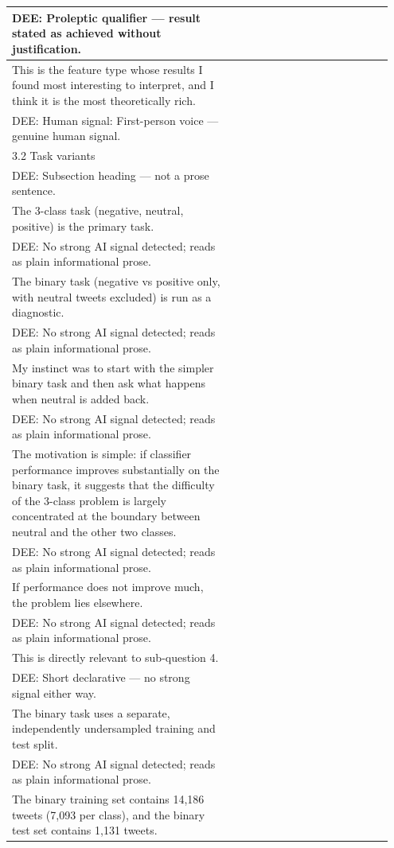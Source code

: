 \documentclass[11pt]{article}
\begin{document}
\begin{longtable}{|p{0.55\linewidth}|p{0.40\linewidth}|}
\hline
DEE: Proleptic qualifier --- result stated as achieved without justification. & \\
\hline
This is the feature type whose results I found most interesting to interpret, and I think it is the most theoretically rich. & \\[2pt]
\hline
DEE: Human signal: First-person voice --- genuine human signal. & \\
\hline
3.2 Task variants & \\[2pt]
\hline
DEE: Subsection heading --- not a prose sentence. & \\
\hline
The 3-class task (negative, neutral, positive) is the primary task. & \\[2pt]
\hline
DEE: No strong AI signal detected; reads as plain informational prose. & \\
\hline
The binary task (negative vs positive only, with neutral tweets excluded) is run as a diagnostic. & \\[2pt]
\hline
DEE: No strong AI signal detected; reads as plain informational prose. & \\
\hline
My instinct was to start with the simpler binary task and then ask what happens when neutral is added back. & \\[2pt]
\hline
DEE: No strong AI signal detected; reads as plain informational prose. & \\
\hline
The motivation is simple: if classifier performance improves substantially on the binary task, it suggests that the difficulty of the 3-class problem is largely concentrated at the boundary between neutral and the other two classes. & \\[2pt]
\hline
DEE: No strong AI signal detected; reads as plain informational prose. & \\
\hline
If performance does not improve much, the problem lies elsewhere. & \\[2pt]
\hline
DEE: No strong AI signal detected; reads as plain informational prose. & \\
\hline
This is directly relevant to sub-question 4. & \\[2pt]
\hline
DEE: Short declarative --- no strong signal either way. & \\
\hline
The binary task uses a separate, independently undersampled training and test split. & \\[2pt]
\hline
DEE: No strong AI signal detected; reads as plain informational prose. & \\
\hline
The binary training set contains 14,186 tweets (7,093 per class), and the binary test set contains 1,131 tweets. & \\[2pt]

\end{longtable}
\end{document}
